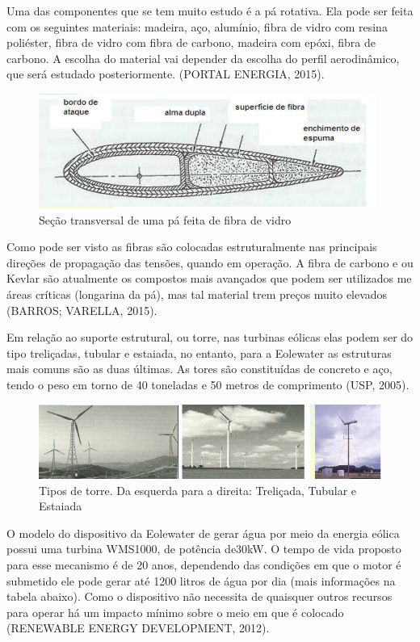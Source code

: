 \documentclass[12pt,openright,oneside,a4paper,brazil]{abntex2}
\begin{document}
	Uma das componentes que se tem muito estudo é a pá rotativa. Ela pode ser feita com os seguintes materiais: madeira, aço, alumínio, fibra de vidro com resina poliéster, fibra de vidro com fibra de carbono, madeira com epóxi, fibra de carbono. A escolha do material vai depender da escolha do perfil aerodinâmico, que será estudado posteriormente. (PORTAL ENERGIA, 2015).
\begin{figure}[!htbp]
\centering
\includegraphics[scale=0.80]{pa}
\caption[Caption title in LOF]{Seção transversal de uma pá feita de fibra de vidro\footnotemark}
\FloatBarrier
\label{Max_Water}
\end{figure}

Como pode ser visto as fibras são colocadas estruturalmente nas principais direções de propagação das tensões, quando em operação. A fibra de carbono e ou Kevlar são atualmente os compostos mais avançados que podem ser utilizados me áreas críticas (longarina da pá), mas tal material trem preços muito elevados (BARROS; VARELLA, 2015).  

Em relação ao suporte estrutural, ou torre, nas turbinas eólicas elas podem ser do tipo treliçadas, tubular e estaiada, no entanto, para a Eolewater as estruturas mais comuns são as duas últimas. As tores são constituídas de concreto e aço, tendo o peso em torno de 40 toneladas e 50 metros de comprimento (USP, 2005).

\begin{figure}[!htbp]
\centering
\includegraphics[scale=0.80]{torre}
\caption[Caption title in LOF]{Tipos de torre. Da esquerda para a direita: Treliçada, Tubular e Estaiada \footnotemark}
\FloatBarrier
\label{torre}
\end{figure}

O modelo do dispositivo da Eolewater de gerar água por meio da energia eólica possui uma turbina WMS1000, de potência de30kW. O tempo de vida proposto para esse mecanismo é de 20 anos, dependendo das condições em que o motor é submetido ele pode gerar até 1200 litros de água por dia (mais informações na tabela abaixo). Como o dispositivo não necessita de quaisquer outros recursos para operar há um impacto mínimo sobre o meio em que é colocado (RENEWABLE ENERGY DEVELOPMENT, 2012).
\end{document}
